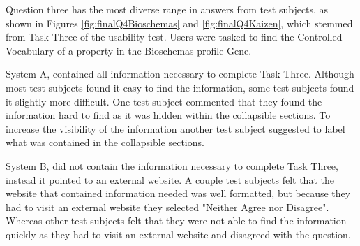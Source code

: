Question three has the most diverse range in answers from test subjects, as shown in Figures \ref{fig:finalQ4Bioschemas} and \ref{fig:finalQ4Kaizen}, which stemmed from Task Three of the usability test. Users were tasked to find the Controlled Vocabulary of a property in the Bioschemas profile Gene.

System A, contained all information necessary to complete Task Three. Although most test subjects found it easy to find the information, some test subjects found it slightly more difficult. One test subject commented that they found the information hard to find as it was hidden within the collapsible sections. To increase the visibility of the information another test subject suggested to label what was contained in the collapsible sections.

System B, did not contain the information necessary to complete Task Three, instead it pointed to an external website. A couple test subjects felt that the website that contained information needed was well formatted, but because they had to visit an external website they selected "Neither Agree nor Disagree". Whereas other test subjects felt that they were not able to find the information quickly as they had to visit an external website and disagreed with the question.

